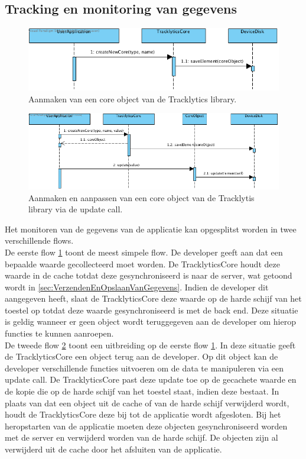 \subsection{Tracking en monitoring van gegevens}\label{sec:TrackingEnMonitoringVanGegevens}
\begin{figure}[!h]
  \centering
  \includegraphics[scale=0.4]{Afbeeldingen/Architectuur/FlowDiagram1}
  \caption{Aanmaken van een core object van de Tracklytics library.}
  \label{fig:flow1}
\end{figure}
\begin{figure}[!h]
  \centering
  \includegraphics[scale=0.4]{Afbeeldingen/Architectuur/FlowDiagram2}
  \caption{Aanmaken en aanpassen van een core object van de Tracklytis library via de update call.}
  \label{fig:flow2}
\end{figure}

Het monitoren van de gegevens van de applicatie kan opgesplitst worden in twee verschillende flows. \\

De eerste flow \ref{fig:flow1} toont de meest simpele flow. De developer geeft aan dat een bepaalde waarde gecollecteerd moet worden. De TracklyticsCore houdt deze waarde in de cache totdat deze gesynchroniseerd is naar de server, wat getoond wordt in \ref{sec:VerzendenEnOpslaanVanGegevens}. Indien de developer dit aangegeven heeft, slaat de TracklyticsCore deze waarde op de harde schijf van het toestel op totdat deze waarde gesynchroniseerd is met de back end. Deze situatie is geldig wanneer er geen object wordt teruggegeven aan de developer om hierop functies te kunnen aanroepen. \\

De tweede flow \ref{fig:flow2} toont een uitbreiding op de eerste flow \ref{fig:flow1}. In deze situatie geeft de TracklyticsCore een object terug aan de developer. Op dit object kan de developer verschillende functies uitvoeren om de data te manipuleren via een update call. De TracklyticsCore past deze update toe op de gecachete waarde en de kopie die op de harde schijf van het toestel staat, indien deze bestaat. In plaats van dat een object uit de cache of van de harde schijf verwijderd wordt, houdt de TracklyticsCore deze bij tot de applicatie wordt afgesloten. Bij het heropstarten van de applicatie moeten deze objecten gesynchroniseerd worden met de server en verwijderd worden van de harde schijf. De objecten zijn al verwijderd uit de cache door het afsluiten van de applicatie.


